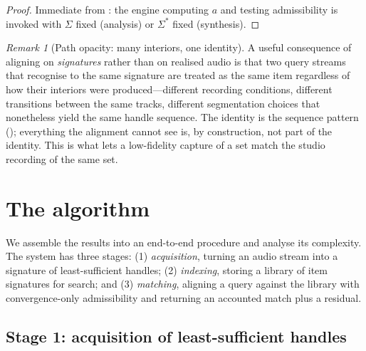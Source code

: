 \documentclass[11pt,twocolumn,a4paper]{article}
\theoremstyle{thmstyle}
\theoremstyle{definition}
\theoremstyle{remark}
\newtheorem{remark}[theorem]{Remark}
\newcommand{\sig}{\Sigma}
\newcommand{\algn}{a}
\begin{document}
\begin{proof}
Immediate from : the engine computing $\algn$ and testing
admissibility is invoked with $\sig$ fixed (analysis) or $\sig^{\ast}$ fixed
(synthesis).
\end{proof}

\begin{remark}[Path opacity: many interiors, one identity]
\label{rem:opacity}
A useful consequence of aligning on \emph{signatures} rather than on realised
audio is that two query streams that recognise to the same signature are treated
as the same item regardless of how their interiors were produced---different
recording conditions, different transitions between the same tracks, different
segmentation choices that nonetheless yield the same handle sequence. The
identity is the sequence pattern (); everything the alignment
cannot see is, by construction, not part of the identity. This is what lets a
low-fidelity capture of a set match the studio recording of the same set.
\end{remark}

\section{The algorithm}
\label{sec:algorithm}

We assemble the results into an end-to-end procedure and analyse its complexity.
The system has three stages: (1) \emph{acquisition}, turning an audio stream into
a signature of least-sufficient handles; (2) \emph{indexing}, storing a library
of item signatures for search; and (3) \emph{matching}, aligning a query against
the library with convergence-only admissibility and returning an accounted match
plus a residual.

\subsection{Stage 1: acquisition of least-sufficient handles}
\end{document}

